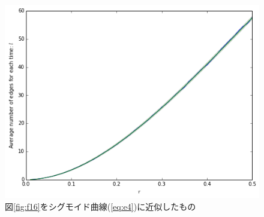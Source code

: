 \begin{figure}[H]
    \begin{center}
        \includegraphics[width=12.5cm]{../img/r_l.png}
        \caption{図\ref{fig:f16}をシグモイド曲線(\ref{eq:e4})に近似したもの}
        \label{fig:f23}
    \end{center}
\end{figure}


